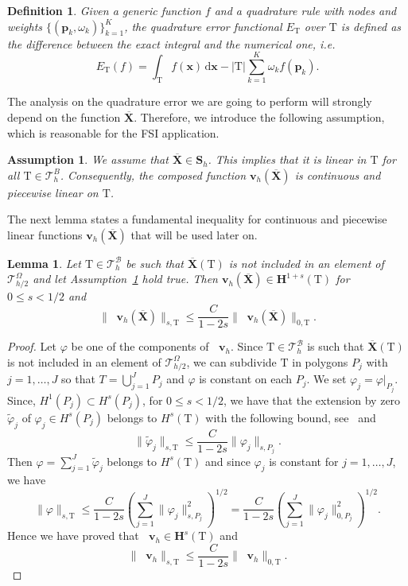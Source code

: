 \documentclass[oneside]{amsart} %
\newcommand{\abs}[1]{\left\lvert#1\right\rvert}
\newtheorem{defi}{Definition}
\newtheorem{lem}{Lemma}
\newtheorem{assump}{Assumption}
\DeclareMathOperator{\grads}{\boldsymbol\nabla_s}
\newcommand\B{\mathcal B} %
\renewcommand\v{\mathbf{v}} %
\newcommand\x{\mathbf{x}} %
\renewcommand\S{\mathbf{S}} %
\renewcommand\H{\mathbf{H}}
\newcommand\X{\mathbf{X}} %
\newcommand\Xbar{\overline{\X}} %
\newcommand\pwg{{\varphi}}
\newcommand\Sline{\S} %
\newcommand\dx{\mathrm{d}\x} %
\newcommand\T{\mathcal{T}} %
\newcommand\quadnode{\mathbf{p}}
\newcommand\quadweigth{\omega}
\newcommand\tri{\mathrm{T}} %
\begin{document}
	\begin{defi} Given a generic function $f$ and a quadrature rule with nodes and weights $\{(\quadnode_k,\quadweigth_k)\}_{k=1}^K$, the quadrature error functional $E_\tri$ over $\tri$ is defined as the difference between the exact integral and the numerical one, i.e. 
		\begin{equation}
			E_\tri(f) = \int_\tri f(\x)\,\dx - \abs{\tri}\sum_{k=1}^K \quadweigth_k f(\quadnode_k).
		\end{equation}
	\end{defi}
	
	The analysis on the quadrature error we are going to perform will strongly depend on the function $\Xbar$. Therefore, we introduce the following assumption, which is reasonable for the FSI application.
	
	\begin{assump}\label{assum:xbar}	
		We assume that $\Xbar\in\Sline_h$. This implies that it is linear in $\tri$ for all $\tri\in\T_h^B$. Consequently, the composed function
		$\v_h(\Xbar)$ is continuous and piecewise linear on
		$\tri$.
	\end{assump} 
	
	The next lemma states a fundamental inequality for continuous and piecewise linear functions $\v_h(\Xbar)$ that will be used later on.
	
	\begin{lem}
		Let $\tri\in\T_h^\B$ be such that $\Xbar(\tri)$ is not included in an element of
		$\T_{h/2}^\Omega$ and let Assumption~\ref{assum:xbar} hold true. Then $\v_h(\Xbar)\in \H^{1+s}(\tri)$ for $0\le s<1/2$ and 
		\[
		\|\grads\v_h(\Xbar)\|_{s,\tri}\le \frac{C}{1-2s} \|\grads\v_h(\Xbar)\|_{0,\tri}.
		\]
		\label{le:duran}
	\end{lem}
	
	\begin{proof}
		Let $\pwg$ be one of the components of $\grads\v_h$. Since $\tri\in\T_h^\B$ is such
		that $\Xbar(\tri)$ is not included in an element of $\T_{h/2}^\Omega$, we can
		subdivide $\tri$ in polygons $P_j$ with $j=1,\dots,J$ so that
		$T=\bigcup_{j=1}^J P_j$ and $\pwg$ is constant on each $P_j$. We set $\pwg_j=\pwg|_{P_j}$. Since, 
		${H^1(P_j)\subset H^s(P_j)}$, for $0\le s<1/2$, we have that the extension by
		zero $\tilde\pwg_j$ of $\pwg_j\in H^s(P_j)$ belongs to $H^s(\tri)$ with the
		following bound, see~\cite[Chap.~1, Th.~11.4]{lions2012non} and~\cite[Sect.~3.1]{duran2020analysis} 
		\[
		\|\tilde\pwg_j\|_{s,\tri}\le \frac{C}{1-2s}\|\pwg_j\|_{s,P_j}.
		\]
		Then $\pwg=\sum_{j=1}^J\tilde\pwg_j$ belongs to $H^s(\tri)$ and since
		$\pwg_j$ is constant for $j=1,\dots,J$, we have
		\[
		\|\pwg\|_{s,\tri}\le \frac{C}{1-2s}
		\left(\sum_{j=1}^J\|\pwg_j\|^2_{s,P_j}\right)^{1/2}
		= \frac{C}{1-2s}
		\left(\sum_{j=1}^J\|\pwg_j\|^2_{0,P_j}\right)^{1/2}.
		\]
		Hence we have proved that $\grads\v_h\in \H^s(\tri)$ and
		\[
		\|\grads\v_h\|_{s,\tri}\le \frac{C}{1-2s} \|\grads\v_h\|_{0,\tri}.
		\]
		
	\end{proof}
	
\end{document}
